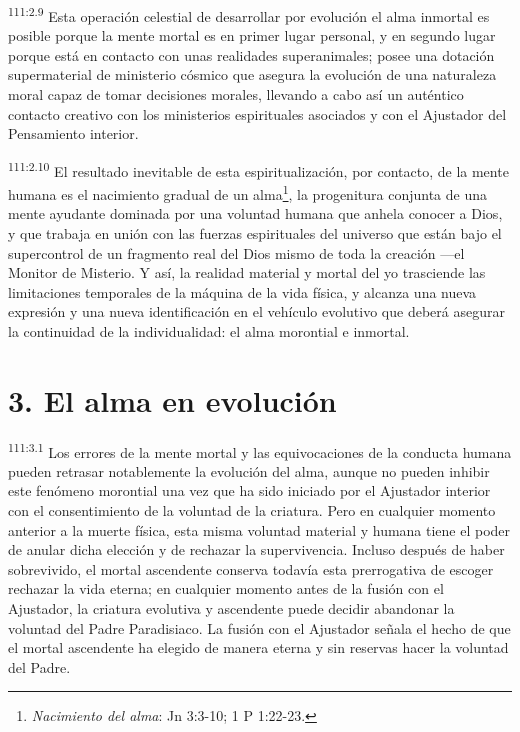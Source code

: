 \documentclass[twoside, 11pt]{book}
\begin{document}
\par
\textsuperscript{111:2.9} Esta operación celestial de desarrollar por evolución el alma inmortal es posible porque la mente mortal es en primer lugar personal, y en segundo lugar porque está en contacto con unas realidades superanimales; posee una dotación supermaterial de ministerio cósmico que asegura la evolución de una naturaleza moral capaz de tomar decisiones morales, llevando a cabo así un auténtico contacto creativo con los ministerios espirituales asociados y con el Ajustador del Pensamiento interior.

\par
\textsuperscript{111:2.10} El resultado inevitable de esta espiritualización, por contacto, de la mente humana es el nacimiento gradual de un alma\footnote{\textit{Nacimiento del alma}: Jn 3:3-10; 1 P 1:22-23.}, la progenitura conjunta de una mente ayudante dominada por una voluntad humana que anhela conocer a Dios, y que trabaja en unión con las fuerzas espirituales del universo que están bajo el supercontrol de un fragmento real del Dios mismo de toda la creación ---el Monitor de Misterio. Y así, la realidad material y mortal del yo trasciende las limitaciones temporales de la máquina de la vida física, y alcanza una nueva expresión y una nueva identificación en el vehículo evolutivo que deberá asegurar la continuidad de la individualidad: el alma morontial e inmortal.

\section*{3. El alma en evolución}
\par
\textsuperscript{111:3.1} Los errores de la mente mortal y las equivocaciones de la conducta humana pueden retrasar notablemente la evolución del alma, aunque no pueden inhibir este fenómeno morontial una vez que ha sido iniciado por el Ajustador interior con el consentimiento de la voluntad de la criatura. Pero en cualquier momento anterior a la muerte física, esta misma voluntad material y humana tiene el poder de anular dicha elección y de rechazar la supervivencia. Incluso después de haber sobrevivido, el mortal ascendente conserva todavía esta prerrogativa de escoger rechazar la vida eterna; en cualquier momento antes de la fusión con el Ajustador, la criatura evolutiva y ascendente puede decidir abandonar la voluntad del Padre Paradisiaco. La fusión con el Ajustador señala el hecho de que el mortal ascendente ha elegido de manera eterna y sin reservas hacer la voluntad del Padre.
\end{document}
